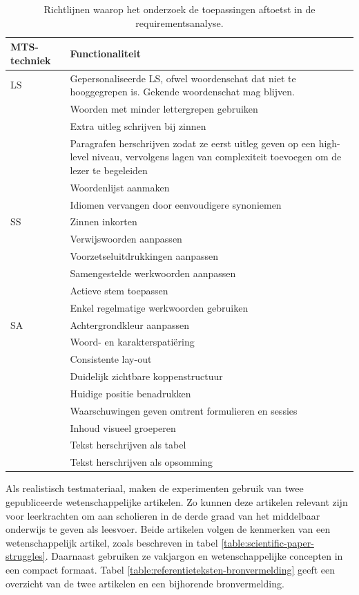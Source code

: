 \begin{center}
	\begin{table}[H]
		\begin{tabular}{ | m{4cm} | m{11cm} | } 
			\hline
			\textbf{MTS-techniek} & \textbf{Functionaliteit} \\
			\hline
			LS & Gepersonaliseerde LS, ofwel woordenschat dat niet te hooggegrepen is. Gekende woordenschat mag blijven. \\
			& Woorden met minder lettergrepen gebruiken \\
			& Extra uitleg schrijven bij zinnen \\
			& Paragrafen herschrijven zodat ze eerst uitleg geven op een high-level niveau, vervolgens lagen van complexiteit toevoegen om de lezer te begeleiden \\
			& Woordenlijst aanmaken \\
			& Idiomen vervangen door eenvoudigere synoniemen \\
			\hline
			SS & Zinnen inkorten \\
			& Verwijswoorden aanpassen \\
			& Voorzetseluitdrukkingen aanpassen \\
			& Samengestelde werkwoorden aanpassen \\
			& Actieve stem toepassen \\
			& Enkel regelmatige werkwoorden gebruiken \\
			\hline
			SA & Achtergrondkleur aanpassen \\
			& Woord- en karakterspatiëring \\
			& Consistente lay-out \\
			& Duidelijk zichtbare koppenstructuur \\
			& Huidige positie benadrukken \\
			& Waarschuwingen geven omtrent formulieren en sessies \\
			& Inhoud visueel groeperen \\
			& Tekst herschrijven als tabel \\
			& Tekst herschrijven als opsomming \\
			\hline
		\end{tabular}
		\caption{Richtlijnen waarop het onderzoek de toepassingen aftoetst in de requirementsanalyse.}
		\label{table:criteria-requirementsanalysis}	
	\end{table}
\end{center}

Als realistisch testmateriaal, maken de experimenten gebruik van twee gepubliceerde wetenschappelijke artikelen. Zo kunnen deze artikelen relevant zijn voor leerkrachten om aan scholieren in de derde graad van het middelbaar onderwijs te geven als leesvoer. Beide artikelen volgen de kenmerken van een wetenschappelijk artikel, zoals beschreven in tabel \ref{table:scientific-paper-struggles}. Daarnaast gebruiken ze vakjargon en wetenschappelijke concepten in een compact formaat. Tabel \ref{table:referentieteksten-bronvermelding} geeft een overzicht van de twee artikelen en een bijhorende bronvermelding.

